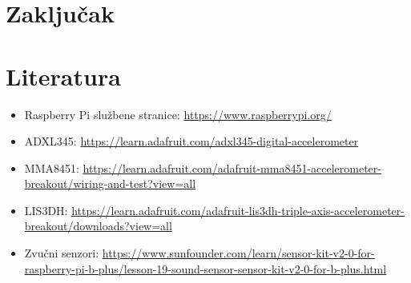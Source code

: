 \documentclass[12pt,a4paper]{article}
\begin{document}
\newpage
\section{Zaključak}

\newpage
\section{Literatura}

\begin{itemize}
	\item Raspberry Pi službene stranice: \url{https://www.raspberrypi.org/}
	\item ADXL345: \url{https://learn.adafruit.com/adxl345-digital-accelerometer}
	\item MMA8451: \url{https://learn.adafruit.com/adafruit-mma8451-accelerometer-breakout/wiring-and-test?view=all}
	\item LIS3DH: \url{https://learn.adafruit.com/adafruit-lis3dh-triple-axis-accelerometer-breakout/downloads?view=all}
	\item Zvučni senzori: \url{https://www.sunfounder.com/learn/sensor-kit-v2-0-for-raspberry-pi-b-plus/lesson-19-sound-sensor-sensor-kit-v2-0-for-b-plus.html}
\end{itemize}
\end{document}

